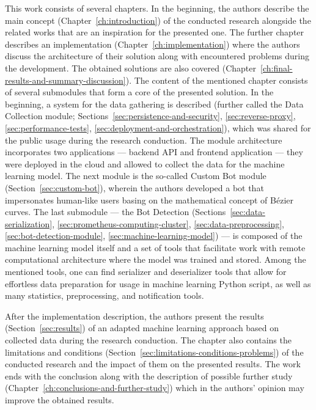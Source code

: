 This work consists of several chapters.
In the beginning, the authors describe the main concept (Chapter~\ref{ch:introduction}) of the conducted research alongside the related works that are an inspiration for the presented one.
The further chapter describes an implementation (Chapter~\ref{ch:implementation}) where the authors discuss the architecture of their solution along with encountered problems during the development.
The obtained solutions are also covered (Chapter~\ref{ch:final-results-and-summary-discussion}).
The content of the mentioned chapter consists of several submodules that form a core of the presented solution.
In the beginning, a system for the data gathering is described (further called the Data Collection module; Sections~\ref{sec:persistence-and-security}, \ref{sec:reverse-proxy}, \ref{sec:performance-tests}, \ref{sec:deployment-and-orchestration}), which was shared for the public usage during the research conduction.
The module architecture incorporates two applications --- backend API and frontend application --- they were deployed in the cloud and allowed to collect the data for the machine learning model.
The next module is the so-called Custom Bot module (Section~\ref{sec:custom-bot}), wherein the authors developed a bot that impersonates human-like users basing on the mathematical concept of Bézier curves.
The last submodule --- the Bot Detection (Sections~\ref{sec:data-serialization}, \ref{sec:prometheus-computing-cluster}, \ref{sec:data-preprocessing}, \ref{sec:bot-detection-module}, \ref{sec:machine-learning-model}) --- is composed of the machine learning model itself and a set of tools that facilitate work with remote computational architecture where the model was trained and stored.
Among the mentioned tools, one can find serializer and deserializer tools that allow for effortless data preparation for usage in machine learning Python script, as well as many statistics, preprocessing, and notification tools.

After the implementation description, the authors present the results (Section~\ref{sec:results}) of an adapted machine learning approach based on collected data during the research conduction.
The chapter also contains the limitations and conditions (Section~\ref{sec:limitations-conditions-problems}) of the conducted research and the impact of them on the presented results.
The work ends with the conclusion along with the description of possible further study (Chapter~\ref{ch:conclusions-and-further-study}) which in the authors' opinion may improve the obtained results.